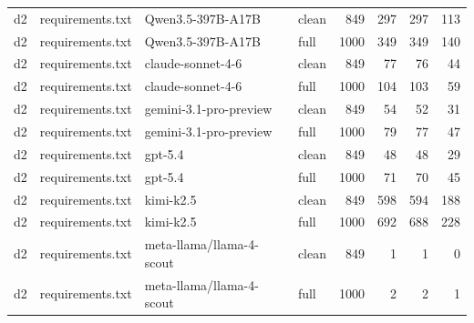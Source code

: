 \begin{tabular}{llllrrrr}
d2 & requirements.txt & Qwen3.5-397B-A17B & clean & 849 & 297 & 297 & 113 \\
d2 & requirements.txt & Qwen3.5-397B-A17B & full & 1000 & 349 & 349 & 140 \\
d2 & requirements.txt & claude-sonnet-4-6 & clean & 849 & 77 & 76 & 44 \\
d2 & requirements.txt & claude-sonnet-4-6 & full & 1000 & 104 & 103 & 59 \\
d2 & requirements.txt & gemini-3.1-pro-preview & clean & 849 & 54 & 52 & 31 \\
d2 & requirements.txt & gemini-3.1-pro-preview & full & 1000 & 79 & 77 & 47 \\
d2 & requirements.txt & gpt-5.4 & clean & 849 & 48 & 48 & 29 \\
d2 & requirements.txt & gpt-5.4 & full & 1000 & 71 & 70 & 45 \\
d2 & requirements.txt & kimi-k2.5 & clean & 849 & 598 & 594 & 188 \\
d2 & requirements.txt & kimi-k2.5 & full & 1000 & 692 & 688 & 228 \\
d2 & requirements.txt & meta-llama/llama-4-scout & clean & 849 & 1 & 1 & 0 \\
d2 & requirements.txt & meta-llama/llama-4-scout & full & 1000 & 2 & 2 & 1 \\
\bottomrule
\end{tabular}
